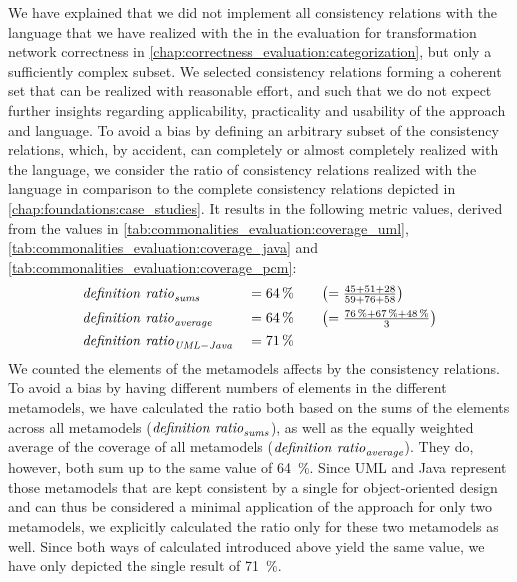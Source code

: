 We have explained that we did not implement all consistency relations with the \commonalities language that we have realized with the \reactionslanguage in the evaluation for transformation network correctness in \autoref{chap:correctness_evaluation:categorization}, but only a sufficiently complex subset.
We selected consistency relations forming a coherent set that can be realized with reasonable effort, and such that we do not expect further insights regarding applicability, practicality and usability of the \commonalities approach and language.
To avoid a bias by defining an arbitrary subset of the consistency relations, which, by accident, can completely or almost completely realized with the \commonalities language, we consider the ratio of consistency relations realized with the \commonalities language in comparison to the complete consistency relations depicted in \autoref{chap:foundations:case_studies}.
It results in the following metric values, derived from the values in \autoref{tab:commonalities_evaluation:coverage_uml}, \autoref{tab:commonalities_evaluation:coverage_java} and \autoref{tab:commonalities_evaluation:coverage_pcm}:
\begin{alignat*}{3}
    &
	\mathit{definition\ ratio}_{\mathit{sums}} &&= \SI{64}{\percent} \quad  &&\bigl(= \tfrac{45 + 51 + 28}{59 + 76 + 58}\bigr)\\
	& 
	\mathit{definition\ ratio}_{\mathit{average}} &&= \SI{64}{\percent} \quad &&\bigl(= \tfrac{\SI{76}{\percent} + \SI{67}{\percent} + \SI{48}{\percent}}{3} \bigr) \\
	&
	\mathit{definition\ ratio}_{\mathit{UML-Java}} &&= \SI{71}{\percent}
\end{alignat*}
We counted the elements of the metamodels affects by the consistency relations.
To avoid a bias by having different numbers of elements in the different metamodels, we have calculated the ratio both based on the sums of the elements across all metamodels ($\mathvariable{definition\ ratio}_{\mathvariable{sums}}$), as well as the equally weighted average of the coverage of all metamodels ($\mathvariable{definition\ ratio}_{\mathvariable{average}}$).
They do, however, both sum up to the same value of \SI{64}{\percent}.
Since \gls{UML} and Java represent those metamodels that are kept consistent by a single \conceptmetamodel for object-oriented design and can thus be considered a minimal application of the \commonalities approach for only two metamodels, we explicitly  calculated the ratio only for these two metamodels as well.
Since both ways of calculated introduced above yield the same value, we have only depicted the single result of \SI{71}{\percent}.

